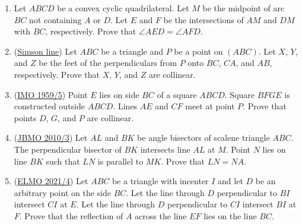\documentclass[11pt,paper=letter]{scrartcl}
\begin{document}
\begin{enumerate}


\item Let $ABCD$ be a convex cyclic quadrilateral. Let $M$ be the midpoint of arc $BC$ not containing $A$ or $D$. Let $E$ and $F$ be the intersections of $AM$ and $DM$ with $BC$, respectively. Prove that $\angle AED = \angle AFD$. %

\item (\href{https://artofproblemsolving.com/wiki/index.php/Simson_line}{Simson line}) Let $ABC$ be a triangle and $P$ be a point on $(ABC)$. Let $X$, $Y$, and $Z$ be the feet of the perpendiculars from $P$ onto $BC$, $CA$, and $AB$, respectively. Prove that $X$, $Y$, and $Z$ are collinear. %

\item (\href{https://artofproblemsolving.com/community/c6h54823p341530}{IMO 1959/5}) Point $E$ lies on side $BC$ of a square $ABCD$. Square $BFGE$ is constructed outside $ABCD$. Lines $AE$ and $CF$ meet at point $P$. Prove that points $D$, $G$, and $P$ are collinear. %

\item (\href{https://artofproblemsolving.com/community/c6h353662p1915250}{JBMO 2010/3}) Let $AL$ and $BK$ be angle bisectors of scalene triangle $ABC$. The perpendicular bisector of $BK$ intersects line $AL$ at $M$. Point $N$ lies on line $BK$ such that $LN$ is parallel to $MK$. Prove that $LN = NA$. %

\item (\href{https://artofproblemsolving.com/community/c6h2526706p21455215}{ELMO 2021/4}) Let $ABC$ be a triangle with incenter $I$ and let $D$ be an arbitrary point on the side $BC$. Let the line through $D$ perpendicular to $BI$ intersect $CI$ at $E$. Let the line through $D$ perpendicular to $CI$ intersect $BI$ at $F$. Prove that the reflection of $A$ across the line $EF$ lies on the line $BC$. %

\end{enumerate}
\end{document}
